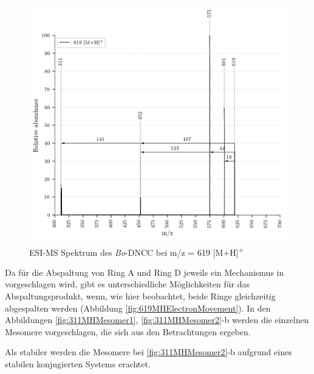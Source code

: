 \begin{figure}[!htbp]
  \centering
  \includegraphics[width=\textwidth, height=0.7\textwidth]{figures/Kapitel7/Kataboliten/VWA_MS_619.png}
  \caption[ESI-MS Spektrum des \textit{Bo}-DNCC, Quelle: Autor]{ESI-MS Spektrum des \textit{Bo}-DNCC bei m/z = 619 [M+H]\textsuperscript{+}}
  \label{fig:619MH}
\end{figure}

Da für die Abspaltung von Ring A und Ring D jeweils ein Mechanismus in \cite{StructureElucidation} vorgeschlagen wird, gibt es unterschiedliche Möglichkeiten für das Abspaltungsprodukt, wenn, wie hier beobachtet, beide Ringe gleichzeitig abgespalten werden (Abbildung \ref{fig:619MHElectronMovement}). In den Abbildungen \ref{fig:311MHMesomer1}, \ref{fig:311MHMesomer2}-b werden die einzelnen Mesomere vorgeschlagen, die sich aus den Betrachtungen ergeben. 

Als stabiler werden die Mesomere bei \ref{fig:311MHMesomer2}-b aufgrund eines stabilen konjugierten Systems erachtet.

